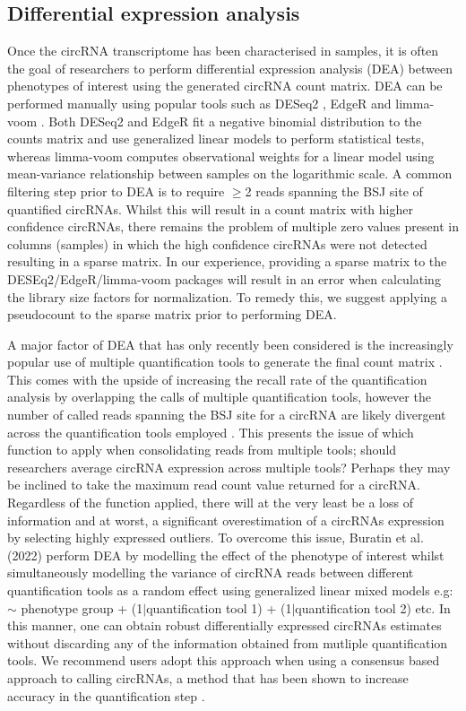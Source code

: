 \subsection{Differential expression analysis}
Once the circRNA transcriptome has been characterised in samples, it is often the goal of researchers to perform differential expression analysis (DEA) between phenotypes of interest using the generated circRNA count matrix. DEA can be performed manually using popular tools such as DESeq2 \cite{Love2014Dec}, EdgeR \cite{Robinson2010Jan} and limma-voom \cite{Law2014Feb}. Both DESeq2 and EdgeR fit a negative binomial distribution to the counts matrix and use generalized linear models to perform statistical tests, whereas limma-voom computes observational weights for a linear model using mean-variance relationship between samples on the logarithmic scale. A common filtering step prior to DEA is to require $\geq$2 reads spanning the BSJ site of quantified circRNAs. Whilst this will result in a count matrix with higher confidence circRNAs, there remains the problem of multiple zero values present in columns (samples) in which the high confidence circRNAs were not detected resulting in a sparse matrix. In our experience, providing a sparse matrix to the DESEq2/EdgeR/limma-voom packages will result in an error when calculating the library size factors for normalization. To remedy this, we suggest applying a pseudocount to the sparse matrix prior to performing DEA. \par
A major factor of DEA that has only recently been considered is the increasingly popular use of multiple quantification tools to generate the final count matrix \cite{Hansen2018, CirComPara2, Digby2023Dec}. This comes with the upside of increasing the recall rate of the quantification analysis by overlapping the calls of multiple quantification tools, however the number of called reads spanning the BSJ site for a circRNA are likely divergent across the quantification tools employed \cite{Hansen2016Apr,Hansen2018}. This presents the issue of which function to apply when consolidating reads from multiple tools; should researchers average circRNA expression across multiple tools? Perhaps they may be inclined to take the maximum read count value returned for a circRNA. Regardless of the function applied, there will at the very least be a loss of information and at worst, a significant overestimation of a circRNAs expression by selecting highly expressed outliers. To overcome this issue, Buratin et al. (2022) \cite{Buratin2022} perform DEA by modelling the effect of the phenotype of interest whilst simultaneously modelling the variance of circRNA reads between different quantification tools as a random effect using generalized linear mixed models e.g: $\sim$ phenotype group + (1$\vert$quantification tool 1) + (1$\vert$quantification tool 2) etc. In this manner, one can obtain robust differentially expressed circRNAs estimates without discarding any of the information obtained from mutliple quantification tools. We recommend users adopt this approach when using a consensus based approach to calling circRNAs, a method that has been shown to increase accuracy in the quantification step \cite{Hansen2018}. \par
